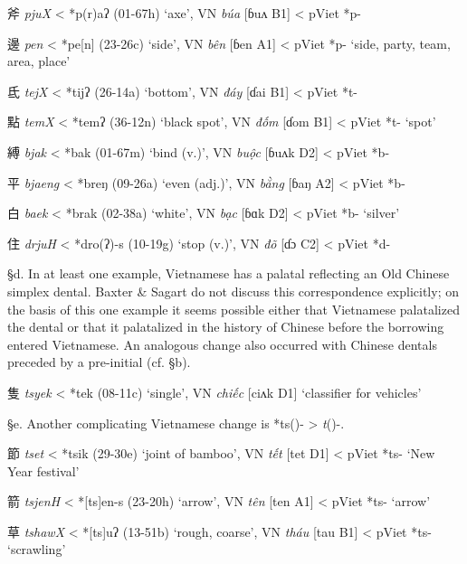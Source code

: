 \begin{description} \item
斧 \emph{pjuX} \textless{} *p(r)aʔ (01-67h) `axe', VN \emph{búa} {[}ɓuʌ
B1] \textless{} pViet *p-
\item
邊 \emph{pen} \textless{} *p{}e[n] (23-26c) `side', VN \emph{bên}
{[}ɓen A1] \textless{} pViet *p- `side, party, team, area, place'
\item
氐 \emph{tejX} \textless{} *t{}ijʔ (26-14a) `bottom', VN \emph{đáy}
{[}ɗai B1] \textless{} pViet *t-
\item
點 \emph{temX} \textless{} *t{}emʔ (36-12n) `black spot', VN \emph{đốm}
{[}ɗom B1] \textless{} pViet *t- `spot'
\item
縛 \emph{bjak} \textless{} *bak (01-67m) `bind (v.)', VN \emph{buộc}
{[}ɓuʌk D2] \textless{} pViet *b-
\item
平 \emph{bjaeng} \textless{} *breŋ (09-26a) `even (adj.)', VN
\emph{bằng} {[}ɓaŋ A2] \textless{} pViet *b-
\item
白 \emph{baek} \textless{} *b{}rak (02-38a) `white', VN \emph{bạc} {[}ɓɑk
D2] \textless{} pViet *b- `silver'
\item
住 \emph{drjuH} \textless{} *dro(ʔ)-s (10-19g) `stop (v.)', VN \emph{đõ}
{[}ɗɔ C2] \textless{} pViet *d-
\end{description}

§d. In at least one example, Vietnamese has a palatal reflecting an Old
Chinese simplex dental. Baxter \& Sagart do not discuss this
correspondence explicitly; on the basis of this one example it seems
possible either that Vietnamese palatalized the dental or that it
palatalized in the history of Chinese before the borrowing entered
Vietnamese. An analogous change also occurred with Chinese dentals
preceded by a pre-initial (cf. §b).

\begin{description} \item
隻  \emph{tsyek} \textless{} *tek (08-11c) `single', VN \emph{chiếc}
{[}ciʌk D1] `classifier for vehicles'
\end{description}

§e. Another complicating Vietnamese change is *ts({})- \textgreater{}
\emph{t}(\emph{{}})-.

\begin{description} \item
節  \emph{tset} \textless{} *ts{}ik (29-30e) `joint of bamboo', VN
\emph{tết} {[}tet D1] \textless{} pViet *ts- `New Year festival'

\item
箭  \emph{tsjenH} \textless{} *[ts]en-s (23-20h) `arrow', VN
\emph{tên} {[}ten A1] \textless{} pViet *ts- `arrow'

\item
草  \emph{tshawX} \textless{} *[ts{}]{}uʔ (13-51b) `rough, coarse', VN
\emph{tháu} {[}t{}au B1] \textless{} pViet *ts{}- `scrawling'
\end{description}

